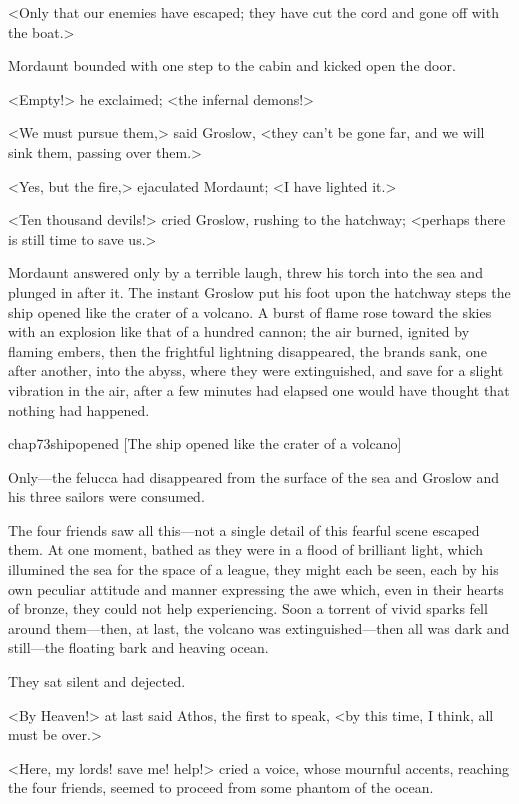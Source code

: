 <Only that our enemies have escaped; they have cut the cord and gone off with the boat.>

Mordaunt bounded with one step to the cabin and kicked open the door.

<Empty!> he exclaimed; <the infernal demons!>

<We must pursue them,> said Groslow, <they can't be gone far, and we will sink them, passing over them.>

<Yes, but the fire,> ejaculated Mordaunt; <I have lighted it.>

<Ten thousand devils!> cried Groslow, rushing to the hatchway; <perhaps there is still time to save us.>

Mordaunt answered only by a terrible laugh, threw his torch into the sea and plunged in after it. The instant Groslow put his foot upon the hatchway steps the ship opened like the crater of a volcano. A burst of flame rose toward the skies with an explosion like that of a hundred cannon; the air burned, ignited by flaming embers, then the frightful lightning disappeared, the brands sank, one after another, into the abyss, where they were extinguished, and save for a slight vibration in the air, after a few minutes had elapsed one would have thought that nothing had happened.

\begin{bwbigpic}
	[\basicscale] 
	{chap73shipopened}
	[The ship opened like the crater of a volcano]
\end{bwbigpic}

Only—the felucca had disappeared from the surface of the sea and Groslow and his three sailors were consumed.

The four friends saw all this—not a single detail of this fearful scene escaped them. At one moment, bathed as they were in a flood of brilliant light, which illumined the sea for the space of a league, they might each be seen, each by his own peculiar attitude and manner expressing the awe which, even in their hearts of bronze, they could not help experiencing. Soon a torrent of vivid sparks fell around them—then, at last, the volcano was extinguished—then all was dark and still—the floating bark and heaving ocean.

They sat silent and dejected.

<By Heaven!> at last said Athos, the first to speak, <by this time, I think, all must be over.>

<Here, my lords! save me! help!> cried a voice, whose mournful accents, reaching the four friends, seemed to proceed from some phantom of the ocean.

